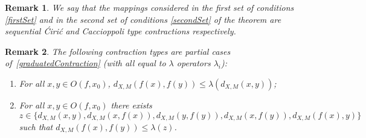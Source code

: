 \documentclass[12pt]{amsart}          %
\newtheorem{remark}{Remark}
\begin{document}
{
\begin{remark}
We say that the mappings considered in the first set of conditions \ref{firstSet} and in the second set of conditions \ref{secondSet} of the theorem are sequential \'Ciri\'c and  Caccioppoli type contractions respectively.
\end{remark}
}

\begin{remark}
The following contraction types are partial cases of~\eqref{graduatedContraction} (with all equal to $\lambda$ operators $\lambda_i$):
\begin{enumerate}
    \item For all $x,y\in O(f,x_0)$, $d_{X,M}(f(x),f(y))\le \lambda(d_{X,M}(x,y))$;
    \item For all  $x,y\in O(f,x_0)$ there exists 
    $$
    z\in \{d_{X,M}(x,y), d_{X,M}(x,f(x)), d_{X,M}(y,f(y)), d_{X,M}(x,f(y)), d_{X,M}(f(x),y)\}
    $$
    such that $d_{X,M}(f(x),f(y))\le \lambda(z)$.
\end{enumerate}
\end{remark}
\end{document}
